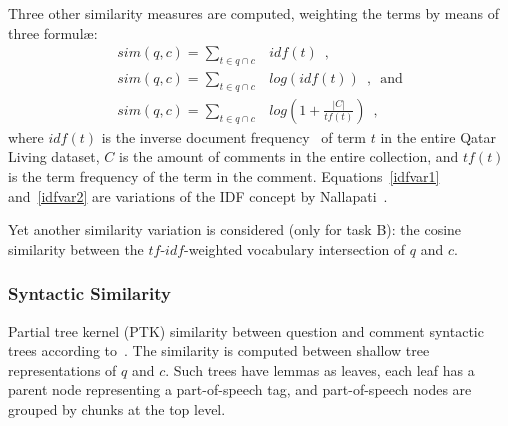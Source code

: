 Three other similarity measures are computed, weighting the terms by means of 
three 
formul\ae: 
%
\begin{eqnarray}
 sim(q, c)=\sum_{t\in q\cap c} & idf(t) \enspace,		\\
 sim(q, c)=\sum_{t\in q\cap c} & log(idf(t)) \enspace, \enspace \mathrm{and} 
\label{idfvar1}\\
 sim(q, c)=\sum_{t\in q\cap c} & log\left(1 + \frac{|C|}{tf(t)}\right) \enspace 
,
\label{idfvar2}
\end{eqnarray}
% 
where $idf(t)$ is the inverse document frequency~\cite{Jones:1972} of term $t$ 
in the entire Qatar Living dataset, $C$ is the amount of comments in the entire 
collection, and $tf(t)$ is the term frequency of the term in the comment. 
Equations~\ref{idfvar1} and~\ref{idfvar2} are variations of the IDF concept by 
Nallapati~.

Yet another similarity variation is considered (only for task B): the cosine 
similarity between the $tf$-$idf$-weighted vocabulary intersection of $q$ and 
$c$.


\subsubsection{Syntactic Similarity}
\label{sub:syntactic}

Partial tree kernel (PTK) similarity between question and comment syntactic 
trees according to~\cite{Moschitti:2006}. The similarity is computed between 
shallow tree  representations of $q$ and $c$. Such trees have lemmas as leaves, 
each leaf has a parent node representing a part-of-speech tag, and 
part-of-speech nodes are grouped by chunks at the top level.

